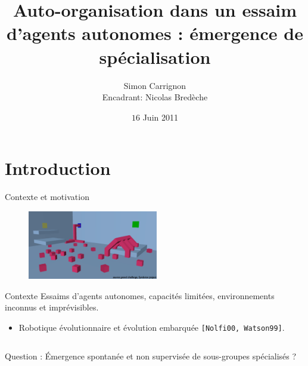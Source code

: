 \documentclass[8pt, handout=show,notes=show]{beamer}
\author[]{Simon Carrignon \\ 
\vfill Encadrant: Nicolas Bred\`{e}che }
\institute[]{
	École~Pratique~des~Hautes~Études, \and TAO/LRI\\
	\pgfdeclareimage[height=0.5cm]{ephe}{images/logo_ephe_large.jpg} %
	\pgfuseimage{ephe} \hfill \pgfdeclareimage[height=0.5cm]{inria}{images/taologo.jpg} %
	\pgfuseimage{inria}
	
}
\title{Auto-organisation dans un essaim d'agents autonomes : \'{e}mergence de sp\'{e}cialisation}
\date{$16$ Juin 2011}
\begin{document}
\begin{frame}
\maketitle

	\end{frame}
	
	\section{Introduction}
	\begin{frame}{Contexte et motivation}
	\begin{figure}
	\includegraphics[height=3cm]{images/symbrion-gc1b.png}
	\end{figure}
	\begin{block}{Contexte}
		Essaims d'agents autonomes, capacités limitées, environnements inconnus et imprévisibles.
	\begin{itemize}
		\item Robotique évolutionnaire et évolution embarquée {\scriptsize \texttt{[Nolfi00, Watson99]}}.
	\end{itemize}
	\end{block}
	

	
	
	\begin{columns}

	\begin{alertblock}{Question :}
	\'{E}mergence spontanée et non supervisée de sous-groupes spécialisés ?
	\end{alertblock}
	\end{columns}

	
	
	\end{frame}
	
\end{document}
